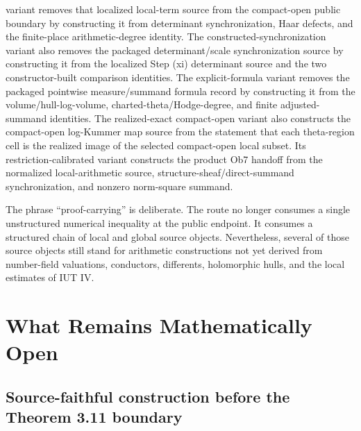 \documentclass[11pt]{article}
\newcommand{\IUT}{IUT}
\theoremstyle{plain}
\theoremstyle{definition}
\theoremstyle{remark}
\begin{document}
variant removes that localized local-term source from the compact-open public
boundary by constructing it from determinant synchronization, Haar defects,
and the finite-place arithmetic-degree identity.  The constructed-synchronization
variant also removes the packaged determinant/scale synchronization source by
constructing it from the localized Step (xi) determinant source and the two
constructor-built comparison identities.  The explicit-formula variant removes
the packaged pointwise measure/summand formula record by constructing it from
the volume/hull-log-volume, charted-theta/Hodge-degree, and finite
adjusted-summand identities.  The realized-exact compact-open variant also
constructs the compact-open log-Kummer map source from the statement that each
theta-region cell is the realized image of the selected compact-open local
subset.  Its restriction-calibrated variant constructs the product Ob7 handoff
from the normalized local-arithmetic source, structure-sheaf/direct-summand
synchronization, and nonzero norm-square summand.

The phrase ``proof-carrying'' is deliberate.  The route no longer consumes a
single unstructured numerical inequality at the public endpoint.  It consumes a
structured chain of local and global source objects.  Nevertheless, several of
those source objects still stand for arithmetic constructions not yet derived
from number-field valuations, conductors, differents, holomorphic hulls, and
the local estimates of \IUT{} IV.

\section{What Remains Mathematically Open}

\subsection{Source-faithful construction before the Theorem 3.11 boundary}
\end{document}
